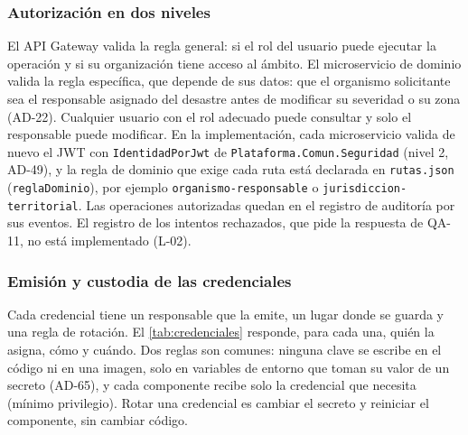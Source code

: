 \documentclass[11pt,letterpaper]{article}
\providecommand{\br}{\discretionary{}{}{}}
\begin{document}
\subsubsection*{Autorización en dos niveles}

El API Gateway valida la regla general: si el rol del usuario
puede ejecutar la operación y si su organización tiene acceso al ámbito. El microservicio de
dominio valida la regla específica, que depende de sus datos: que el organismo solicitante
sea el responsable asignado del desastre antes de modificar su severidad o su zona (AD-22).
Cualquier usuario con el rol adecuado puede consultar y solo el responsable puede
modificar. En la implementación, cada microservicio valida de nuevo el JWT con
\texttt{IdentidadPorJwt} de \texttt{Plataforma.\br{}Comun.\br{}Seguridad} (nivel 2, AD-49), y la regla de
dominio que exige cada ruta está declarada en \texttt{rutas.json} (\texttt{reglaDominio}), por
ejemplo \texttt{organismo-\br{}responsable} o \texttt{jurisdiccion-\br{}territorial}. Las operaciones
autorizadas quedan en el registro de auditoría por sus eventos. El registro de los intentos
rechazados, que pide la respuesta de QA-11, no está implementado (L-02).
\subsubsection*{Emisión y custodia de las credenciales}

Cada credencial tiene un responsable que la emite, un lugar donde se guarda y una regla de rotación.
El \cref{tab:credenciales} responde, para cada una, quién la asigna, cómo y cuándo. Dos reglas son
comunes: ninguna clave se escribe en el código ni en una imagen, solo en variables de entorno que
toman su valor de un secreto (AD-65), y cada componente recibe solo la credencial que necesita (mínimo
privilegio). Rotar una credencial es cambiar el secreto y reiniciar el componente, sin cambiar código.
\end{document}
